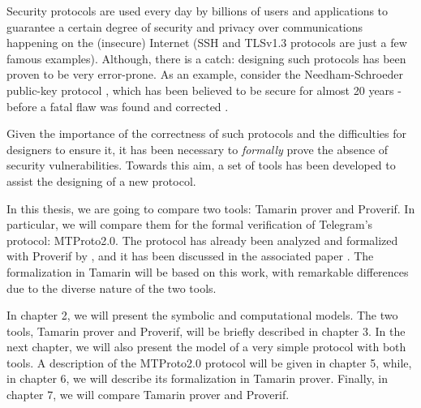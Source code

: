 \label{section:introduction}

Security protocols are used every day by billions of users and applications to guarantee a certain degree of security and privacy over communications happening on the (insecure) Internet (SSH \cite{rfc4251} and TLSv1.3 \cite{TLSv1.3_specs} protocols are just a few famous examples). Although, there is a catch: designing such protocols has been proven to be very error-prone. As an example, consider the Needham-Schroeder public-key protocol \cite{NSPK}, which has been believed to be secure for almost 20 years - before a fatal flaw was found and corrected \cite{NSPK_LoweGavin}.

Given the importance of the correctness of such protocols and the difficulties for designers to ensure it, it has been necessary to \textit{formally} prove the absence of security vulnerabilities. Towards this aim, a set of tools has been developed to assist the designing of a new protocol.

In this thesis, we are going to compare two tools: Tamarin prover and Proverif. In particular, we will compare them for the formal verification of Telegram's protocol: MTProto2.0. The protocol has already been analyzed and formalized with Proverif by \MMNV{} \cite{MTProto2-Proverif-impl}, and it has been discussed in the associated paper \cite{MTProto2-Proverif}. The formalization in Tamarin will be based on this work, with remarkable differences due to the diverse nature of the two tools.

In chapter 2, we will present the symbolic and computational models. The two tools, Tamarin prover and Proverif, will be briefly described in chapter 3. In the next chapter, we will also present the model of a very simple protocol with both tools. A description of the MTProto2.0 protocol will be given in chapter 5, while, in chapter 6, we will describe its formalization in Tamarin prover. Finally, in chapter 7, we will compare Tamarin prover and Proverif.
